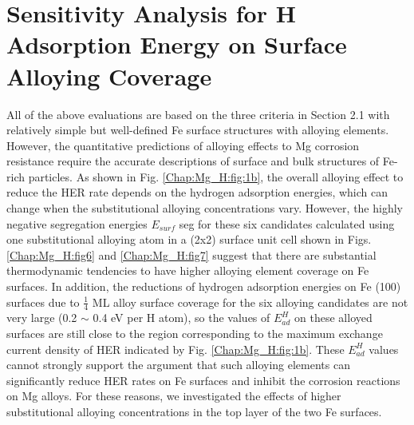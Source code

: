 \section{Sensitivity Analysis for H Adsorption Energy on Surface Alloying Coverage}

All of the above evaluations are based on the three criteria in Section 2.1 with relatively simple but well-defined Fe surface structures with alloying elements. However, the quantitative predictions of alloying effects to Mg corrosion resistance require the accurate descriptions of surface and bulk structures of Fe-rich particles. As shown in Fig. \ref{Chap:Mg_H:fig:1b}, the overall alloying effect to reduce the \ac{HER} rate depends on the hydrogen adsorption energies, which can change when the substitutional alloying concentrations vary. However, the highly negative segregation energies $E_{surf}$ seg for these six candidates calculated using one substitutional alloying atom in a (2x2) surface unit cell shown in Figs. \ref{Chap:Mg_H:fig6} and \ref{Chap:Mg_H:fig7} suggest that there are substantial thermodynamic tendencies to have higher alloying element coverage on Fe surfaces. In addition, the reductions of hydrogen adsorption energies on Fe (100) surfaces due to $\frac{1}{4}$ \ac{ML} alloy surface coverage for the six alloying candidates are not very large (0.2 $\sim$ 0.4 eV per H atom), so the values of $E_{ad}^H$  on these alloyed surfaces are still close to the region corresponding to the maximum exchange current density of HER indicated by Fig. \ref{Chap:Mg_H:fig:1b}. These $E_{ad}^H$ values cannot strongly support the argument that such alloying elements can significantly reduce HER rates on Fe surfaces and inhibit the corrosion reactions on Mg alloys. For these reasons, we investigated the effects of higher substitutional alloying concentrations in the top layer of the two Fe surfaces. 

